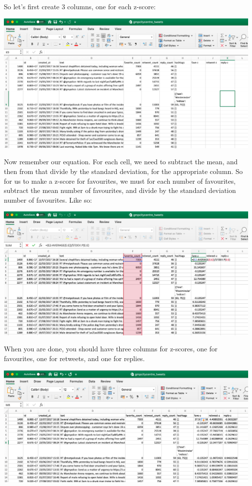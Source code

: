 \documentclass[
]{book}
\begin{document}
So let's first create 3 columns, one for each z-score:

\includegraphics{imgs/z-cols_created.png}

Now remember our equation. For each cell, we need to subtract the mean, and then from that divide by the standard deviation, for the appropriate column. So for us to make a z-score for favourites, we must for each number of favourites, subtract the mean number of favourites, and divide by the standard deviation number of favourites. Like so:

\includegraphics{imgs/fave_z.png}

When you are done, you should have three columns for z-scores, one for favourites, one for retweets, and one for replies.

\includegraphics{imgs/3_z_cols.png}
\end{document}
